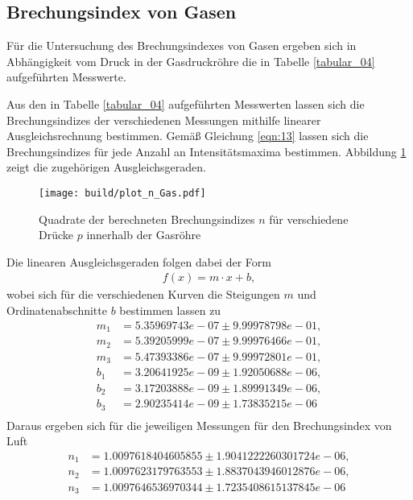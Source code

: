 \subsection{Brechungsindex von Gasen}
\noindent Für die Untersuchung des Brechungsindexes von Gasen ergeben sich in
Abhängigkeit vom Druck in der Gasdruckröhre die in Tabelle \ref{tabular_04}
aufgeführten Messwerte. \\
\FloatBarrier

\FloatBarrier
\noindent Aus den in Tabelle \ref{tabular_04} aufgeführten Messwerten lassen sich
die Brechungsindizes der verschiedenen Messungen mithilfe linearer Ausgleichsrechnung
bestimmen. Gemäß Gleichung \ref{eqn:13} lassen sich die Brechungsindizes für
jede Anzahl an Intensitätsmaxima bestimmen. Abbildung \ref{fig:03} zeigt die
zugehörigen Ausgleichsgeraden. \\
\FloatBarrier
\begin{figure}
  \centering
  \texttt{[image: build/plot\_n\_Gas.pdf]}
  \caption{Quadrate der berechneten Brechungsindizes $n$ für verschiedene Drücke
  $p$ innerhalb der Gasröhre}
  \label{fig:03}
\end{figure}
\FloatBarrier
\noindent Die linearen Ausgleichsgeraden folgen dabei der Form
\begin{align}
  f(x) = m \cdot x + b,
\end{align}
wobei sich für die verschiedenen Kurven die Steigungen $m$ und Ordinatenabschnitte
$b$ bestimmen lassen zu
\begin{align*}
  m_1 &= 5.35969743e-07 \pm 9.99978798e-01, \\
  m_2 &= 5.39205999e-07 \pm 9.99976466e-01, \\
  m_3 &= 5.47393386e-07 \pm 9.99972801e-01, \\
  b_1 &= 3.20641925e-09 \pm 1.92050688e-06, \\
  b_2 &= 3.17203888e-09 \pm 1.89991349e-06, \\
  b_3 &= 2.90235414e-09 \pm 1.73835215e-06 \\
\end{align*}
%
%
%
%
\noindent Daraus ergeben sich für die jeweiligen Messungen für den Brechungsindex
von Luft
\begin{align}
  n_1 &= 1.0097618404605855  \pm  1.9041222260301724e-06, \\
  n_2 &= 1.0097623179763553  \pm  1.8837043946012876e-06, \\
  n_3 &= 1.0097646536970344  \pm  1.7235408615137845e-06 \\
\end{align}
